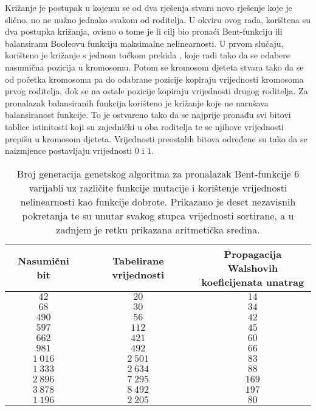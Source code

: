 Križanje je postupak u kojemu se od dva rješenja stvara novo rješenje koje je slično, no ne nužno jednako svakom od roditelja.
U okviru ovog rada, korištena su dva postupka križanja, ovisno o tome je li cilj bio pronaći Bent-funkciju ili balansiranu Booleovu funkciju maksimalne nelinearnosti.
U prvom slučaju, korišteno je križanje s jednom točkom prekida \cite{PrirodomInspirirani}, koje radi tako da se odabere nasumična pozicija u kromosomu.
Potom se kromosom djeteta stvara tako da se od početka kromosoma pa do odabrane pozicije kopiraju vrijednosti kromosoma prvog roditelja, dok se na ostale pozicije kopiraju vrijednosti drugog roditelja.
Za pronalazak balansiranih funkcija korišteno je križanje koje ne narušava balansiranost funkcije.
To je ostvareno tako da se najprije pronađu svi bitovi tablice istinitosti koji su zajednički u oba roditelja te se njihove vrijednosti prepišu u kromosom djeteta.
Vrijednosti preostalih bitova određene su tako da se naizmjence postavljaju vrijednosti $0$ i $1$.

\begin{table}[]
    \centering
    \captionsetup{justification=centering}
    \caption{Broj generacija genetskog algoritma za pronalazak Bent-funkcije $6$ varijabli uz različite funkcije mutacije i korištenje vrijednosti nelinearnosti kao funkcije dobrote. Prikazano je deset nezavisnih pokretanja te su unutar svakog stupca vrijednosti sortirane, a u zadnjem je retku prikazana aritmetička sredina.}
    \begin{tabular}{ccc} \hline
        Nasumični bit & Tabelirane vrijednosti & \makecell{Propagacija Walshovih \\ koeficijenata unatrag} \\ \hline
            $42$ &     $20$ &  $14$ \\
            $68$ &     $30$ &  $34$ \\
           $490$ &     $56$ &  $42$ \\
           $597$ &    $112$ &  $45$ \\
           $662$ &    $421$ &  $60$ \\
           $981$ &    $492$ &  $66$ \\
        $1\:016$ & $2\:501$ &  $83$ \\
        $1\:333$ & $2\:634$ &  $88$ \\
        $2\:896$ & $7\:295$ & $169$ \\
        $3\:878$ & $8\:492$ & $197$ \\ \hline
        $1\:196$ & $2\:205$ &  $80$
    \end{tabular}
    \label{tbl:ga_6_nonl}
\end{table}

